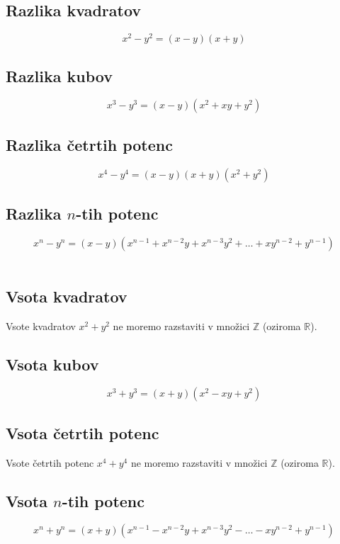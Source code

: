         \subsection*{Razlika kvadratov}
        $$x^2-y^2=(x-y)(x+y)$$
    

        \subsection*{Razlika kubov}
        $$ x^3-y^3=(x-y)(x^2+xy+y^2) $$
    

        \subsection*{Razlika četrtih potenc}
        $$x^4-y^4=(x-y)(x+y)(x^2+y^2)$$
    

        \subsection*{Razlika $n$-tih potenc}
        $$x^n-y^n=(x-y)(x^{n-1}+x^{n-2}y+x^{n-3}y^2+\ldots+xy^{n-2}+y^{n-1})$$
        ~\newline
    
        
        \subsection*{Vsota kvadratov}
        Vsote kvadratov $x^2+y^2$ ne moremo razstaviti v množici $\mathbb{Z}$ (oziroma $\mathbb{R}$).
    
    
        \subsection*{Vsota kubov}
        $$ x^3+y^3=(x+y)(x^2-xy+y^2) $$
        

        \subsection*{Vsota četrtih potenc}
        Vsote četrtih potenc $x^4+y^4$ ne moremo razstaviti v množici $\mathbb{Z}$ (oziroma $\mathbb{R}$).
    

        \subsection*{Vsota $n$-tih potenc}
        $$x^n+y^n=(x+y)(x^{n-1}-x^{n-2}y+x^{n-3}y^2-\ldots-xy^{n-2}+y^{n-1})$$
        ~\newline
    
